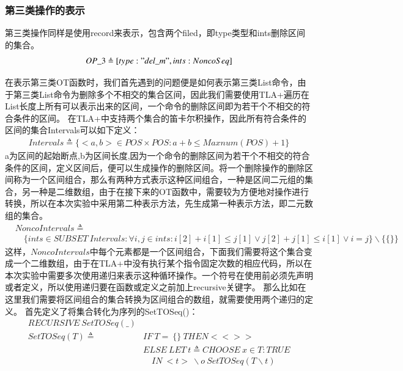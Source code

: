 \subsubsection{第三类操作的表示}
第三类操作同样是使用record来表示，包含两个filed，即type类型和ints删除区间的集合。
\begin{align*}
OP\_3 \triangleq [type:{"del\_m"},ints:NoncoSeq] \\
\end{align*}

在表示第三类OT函数时，我们首先遇到的问题便是如何表示第三类List命令，由于第三类List命令为删除多个不相交的集合区间，因此我们需要使用TLA+遍历在List长度上所有可以表示出来的区间，一个命令的删除区间即为若干个不相交的符合条件的区间。
在TLA+中支持两个集合的笛卡尔积操作，因此所有符合条件的区间的集合Intervals可以如下定义：
\begin{align*}
Intervals \triangleq \{<a,b> \in POS \times POS: a+b \le Maxnum(POS)+1 \}
\end{align*}
a为区间的起始断点,b为区间长度,因为一个命令的删除区间为若干个不相交的符合条件的区间，定义区间后，便可以生成操作的删除区间。将一个删除操作的删除区间称为一个区间组合，那么有两种方式表示这种区间组合，一种是区间二元组的集合，另一种是二维数组，由于在接下来的OT函数中，需要较为方便地对操作进行转换，所以在本次实验中采用第二种表示方法，先生成第一种表示方法，即二元数组的集合。
\begin{align*}
& NoncoIntervals \triangleq \\ 
& \quad \{ints \in SUBSET \ Intervals : \forall i,j \in ints: i[2]+i[1] \le j[1] \lor j[2]+j[1] \le i[1] \lor i=j\} \backslash \{\{\}\}
\end{align*}
这样，$NoncoIntervals$中每个元素都是一个区间组合，下面我们需要将这个集合变成一个二维数组，由于在TLA+中没有执行某个指令固定次数的相应代码，所以在本次实验中需要多次使用递归来表示这种循环操作。一个符号在使用前必须先声明或者定义，所以使用递归要在函数或定义之前加上recursive关键字。
那么比如在这里我们需要将区间组合的集合转换为区间组合的数组，就需要使用两个递归的定义。
首先定义了将集合转化为序列的SetTOSeq()：
\begin{align*}
RECURSIVE\ SetTOSeq(\_)\\
SetTOSeq(T) \triangleq &IF\ T =\ \{\}\ THEN <<>>\\
                       & ELSE\ LET\ t \triangleq CHOOSE\ x \in T : TRUE\\
                        & \quad IN\ <t>\ \backslash o\ SetTOSeq(T \backslash {t})\\
\end{align*}
